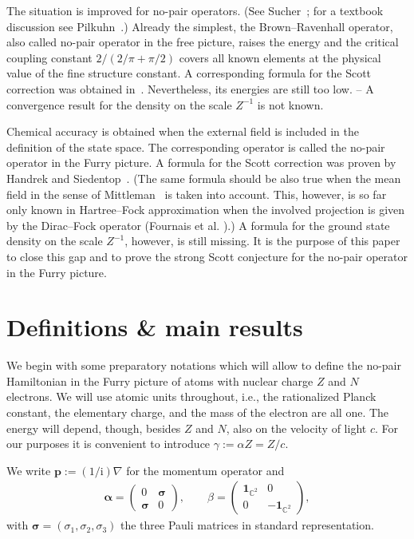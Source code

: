 \documentclass[10pt]{amsart}
\theoremstyle{definition}
\newcommand*\ri{\mathrm{i}}
\newcommand*\cz{\mathbb{C}}
\newcommand{\one}{\mathbf{1}}
\newcommand*\balpha{\bm{\alpha}}
\newcommand*\bsigma{\bm{\sigma}}
\newcommand*\bp{\bm{p}}
\begin{document}
The situation is improved for no-pair operators. (See Sucher~\cite{Sucher1980,Sucher1984,Sucher1987}; for a textbook discussion see Pilkuhn~\cite{Pilkuhn2005}.) Already the simplest, the Brown--Ravenhall operator, also called no-pair operator in the free picture, raises the energy and the critical coupling constant $2/(2/\pi+\pi/2)$ covers all known elements at the physical value of the fine structure constant. A corresponding formula for the Scott correction was obtained in~\cite{Franketal2009}. Nevertheless, its energies are still too low. \linebreak-- A convergence result for the density on the scale $Z^{-1}$ is not known.

Chemical accuracy is obtained when the external field is included in the definition of the state space. The corresponding operator is called the no-pair operator in the Furry picture. A formula for the Scott correction was proven by Handrek and Siedentop~\cite{HandrekSiedentop2015}. (The same formula should be also true when the mean field in the sense of Mittleman~\cite{Mittleman1981} is taken into account. This, however, is so far only known in Hartree--Fock approximation when the involved projection is given by the Dirac--Fock operator (Fournais et al. \cite{Fournaisetal2020}).) A formula for the ground state density on the scale $Z^{-1}$, however, is still missing. It is the purpose of this paper to close this gap and to prove the strong Scott conjecture for the no-pair operator in the Furry picture.

\section{Definitions \& main results}\label{s:defresults}
We begin with some preparatory notations which will allow to define the no-pair Hamiltonian in the Furry picture of atoms with nuclear charge $Z$ and $N$ electrons. We will use atomic units throughout, i.e., the rationalized Planck constant, the elementary charge, and the mass of the electron are all one. The energy will depend, though, besides $Z$ and $N$, also on the velocity of light $c$. For our purposes it is convenient to introduce $\gamma:=\alpha Z=Z/c$.

We write $\bp:=(1/\ri)\nabla$ for the momentum operator and
\begin{align*}
\balpha=\left(
\begin{matrix}
0 & \bsigma\\
\bsigma & 0
\end{matrix}\right),\qquad
\beta=\left(
\begin{matrix}
\one_{\cz^2} & 0\\
0 & -\one_{\cz^2}
\end{matrix}\right),
\end{align*}
with $\bsigma=(\sigma_1,\sigma_2,\sigma_3)$ the three Pauli matrices in standard representation.
\end{document}
